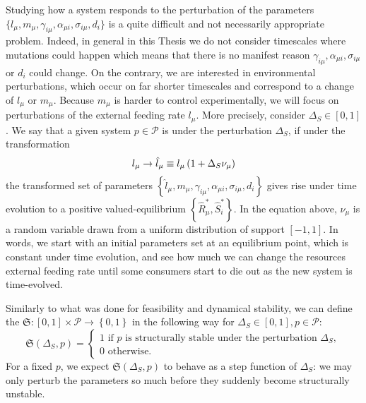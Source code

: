 \documentclass[12pt, titlepage]{report}
\begin{document}
 \noindent Studying how a system responds to the perturbation of the parameters $\{l_\mu, m_\mu, \gamma_{i\mu}, \alpha_{\mu i}, \sigma_{i\mu},d_i\}$ is a quite difficult and not necessarily appropriate problem. Indeed, in general in this Thesis we do not consider timescales where mutations could happen which means that there is no manifest reason $\gamma_{i\mu}, \alpha_{\mu i}, \sigma_{i\mu}$ or $d_i$ could change. On the contrary, we are interested in environmental perturbations, which occur on far shorter timescales and correspond to a change of $l_\mu$ or $m_\mu$. Because $m_\mu$ is harder to control experimentally, we will focus on perturbations of the external feeding rate $l_\mu$. %
More precisely, consider $\Delta_S \in [0,1]$. We say that a given system $p \in \mathcal{P}$ is  under the perturbation $\Delta_S$, if under the transformation
\begin{equation}
l_\mu \rightarrow \hat{l}_\mu \equiv l_\mu\left( 1+\Delta_S \nu_\mu \right) \label{eq : ss methods l perturbation}
\end{equation}
the transformed set of parameters $\left\{ \hat{l}_\mu, m_\mu, \gamma_{i\mu}, \alpha_{\mu i}, \sigma_{i\mu},d_i \right\}$ gives rise under time evolution to a positive valued-equilibrium $\left\{\hat{R}^*_\mu, \hat{S}^*_i\right\}$. In the equation above, $\nu_\mu$ is a random variable drawn from a uniform distribution of support $[-1, 1]$. In words, we start with an initial parameters set at an equilibrium point, which is constant under time evolution, and see how much we can change the resources external feeding rate until some consumers start to die out as the new system is time-evolved.

Similarly to what was done for feasibility and dynamical stability, we can define the  $\mathfrak{S} :
 [0,1] \times \mathcal{P} \rightarrow \left\{0,1\right\}$ in the following way for $\Delta_S \in [0,1], p \in \mathcal{P}$:
\begin{equation}
\mathfrak{S}(\Delta_S, p)=
\begin{cases}
1 \text{ if }p \text{ is structurally stable under the perturbation }\Delta_S, \\
0 \text{ otherwise.}
\end{cases}
\end{equation}
For a fixed $p$, we expect $\mathfrak{S}(\Delta_S, p)$ to behave as a step function of $\Delta_S$: we may only perturb the parameters so much before they suddenly become structurally unstable.
\end{document}
